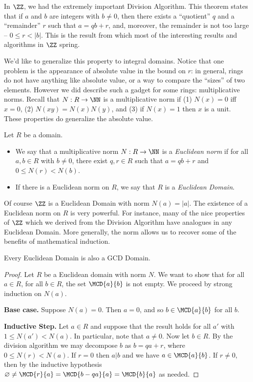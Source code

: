 \documentclass{article}
\begin{document}

In $\ZZ$, we had the extremely important Division Algorithm. This theorem states that if $a$ and $b$ are integers with $b \neq 0$, then there exists a ``quotient'' $q$ and a ``remainder'' $r$ such that $a = qb + r$, and, moreover, the remainder is not too large -- $0 \leq r < |b|$. This is the result from which most of the interesting results and algorithms in $\ZZ$ spring.

We'd like to generalize this property to integral domains. Notice that one problem is the appearance of absolute value in the bound on $r$: in general, rings do not have anything like absolute value, or a way to compare the ``sizes'' of two elements. However we did describe such a gadget for some rings: multiplicative norms. Recall that $N : R \rightarrow \NN$ is a multiplicative norm if (1) $N(x) = 0$ iff $x = 0$, (2) $N(xy) = N(x)N(y)$, and (3) if $N(x) = 1$ then $x$ is a unit. These properties do generalize the absolute value.

\begin{dfn}
Let $R$ be a domain.
\begin{itemize}
\item We say that a multiplicative norm $N : R \rightarrow \NN$ is a \emph{Euclidean norm} if for all $a,b \in R$ with $b \neq 0$, there exist $q,r \in R$ such that $a = qb+r$ and $0 \leq N(r) < N(b)$.
\item If there is a Euclidean norm on $R$, we say that $R$ is a \emph{Euclidean Domain}.
\end{itemize}
\end{dfn}

Of course $\ZZ$ is a Euclidean Domain with norm $N(a) = |a|$. The existence of a Euclidean norm on $R$ is very powerful. For instance, many of the nice properties of $\ZZ$ which we derived from the Division Algorithm have analogues in any Euclidean Domain. More generally, the norm allows us to recover some of the benefits of mathematical induction.

\begin{prop}
Every Euclidean Domain is also a GCD Domain.
\end{prop}

\begin{proof}
Let $R$ be a Euclidean domain with norm $N$. We want to show that for all $a \in R$, for all $b \in R$, the set $\MCD{a}{b}$ is not empty. We proceed by strong induction on $N(a)$.

\textbf{Base case.} Suppose $N(a) = 0$. Then $a = 0$, and so $b \in \MCD{a}{b}$ for all $b$.

\textbf{Inductive Step.} Let $a \in R$ and suppose that the result holds for all $a'$ with $1 \leq N(a') < N(a)$. In particular, note that $a \neq 0$. Now let $b \in R$. By the division algorithm we may decompose $b$ as $b = qa + r$, where $0 \leq N(r) < N(a)$. If $r = 0$ then $a|b$ and we have $a \in \MCD{a}{b}$. If $r \neq 0$, then by the inductive hypothesis $\varnothing \neq \MCD{r}{a} = \MCD{b-qa}{a} = \MCD{b}{a}$ as needed.
\end{proof}
\end{document}
